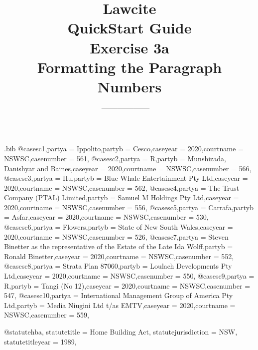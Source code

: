 \begin{filecontents*}[overwrite]{\jobname.bib}
@case{sc1,partya = {Ippolito},partyb = {Cesco},caseyear = {2020},courtname = {NSWSC},casenumber = {561},}
@case{sc2,partya = {R},partyb = {Munshizada, Danishyar and Baines},caseyear = {2020},courtname = {NSWSC},casenumber = {566},}
@case{sc3,partya = {Hu},partyb = {Blue Whale Entertainment Pty Ltd},caseyear = {2020},courtname = {NSWSC},casenumber = {562},}
@case{sc4,partya = {The Trust Company (PTAL) Limited},partyb = {Samuel M Holdings Pty Ltd},caseyear = {2020},courtname = {NSWSC},casenumber = {556},}
@case{sc5,partya = {Carrafa},partyb = {Asfar},caseyear = {2020},courtname = {NSWSC},casenumber = {530},}
@case{sc6,partya = {Flowers},partyb = {State of New South Wales},caseyear = {2020},courtname = {NSWSC},casenumber = {526},}
@case{sc7,partya = {Steven Binetter as the representative of the Estate of the Late Ida Wolff},partyb = {Ronald Binetter},caseyear = {2020},courtname = {NSWSC},casenumber = {552},}
@case{sc8,partya = {Strata Plan 87060},partyb = {Loulach Developments Pty Ltd},caseyear = {2020},courtname = {NSWSC},casenumber = {550},}
@case{sc9,partya = {R},partyb = {Tangi (No 12)},caseyear = {2020},courtname = {NSWSC},casenumber = {547},}
@case{sc10,partya = {International Management Group of America Pty Ltd},partyb = {Media Niugini Ltd t/as EMTV},caseyear = {2020},courtname = {NSWSC},casenumber = {559},}

@statute{hba,
statutetitle = {Home Building Act},
statutejurisdiction = {NSW},
statutetitleyear = {1989},%
}



\end{filecontents*}

\documentclass[12pt]{article}
\title{Lawcite\\QuickStart Guide \\Exercise 3a\\ {\normalsize Formatting the Paragraph Numbers}\\[24pt]\normalsize \hfill ---------\hfill\ }
\author{}
\date{}
\newcommand\rulesep{\rule{0.4\textwidth}{.4pt}}
\usepackage[table]{xcolor}
\usepackage{fontspec}
\setmainfont{Noto Serif}
\setsansfont{Noto Sans}[Scale=0.9]
\setmonofont{Noto Sans Mono}[Colour=blue]
\newfontface{}
\newcommand\goodoh{{\large\ftmark 🗸}}
\newcommand\notsogoodoh{{\large\ftmark 🗶}}
\usepackage{tikz}
\usetikzlibrary{shadows,backgrounds}

\usepackage{splitidx}

\newcommand\bef[1]{(\textit{#1})}
\newcommand\cef[1]{\textit{#1}}
\newcommand\cmd[1]{\textsf{\textbackslash\textbf{#1}}}
\newcommand\cmdb[2]{\textsf{\textbackslash\textbf{#1}\{#2\}}}


